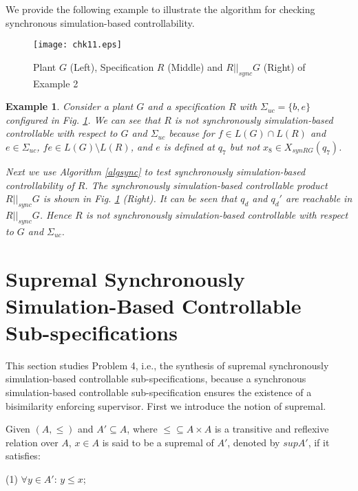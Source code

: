 \documentclass[preprint,authoryear,12pt]{elsarticle}
\newtheorem{Example}{Example}
\begin{document}
We provide the following example to illustrate the algorithm for
checking synchronous simulation-based controllability.

\begin{figure}[!htb]
\begin{center}
\texttt{[image: chk11.eps]}
\caption{ Plant $G$ (Left), Specification $R$ (Middle) and
$R||_{sync} G$ (Right) of Example 2} \label{chk1}
\end{center}
\end{figure}


\begin{Example}\label{checksync}
Consider a plant $G$ and a specification $R$ with
$\Sigma_{uc}=\{b, e\}$ configured in Fig. \ref{chk1}. We can see
that $R$ is not synchronously simulation-based controllable with
respect to $G$ and $\Sigma_{uc}$ because for $f \in L(G)\cap L(R)$
and $e \in \Sigma_{uc}$, $fe \in L(G)\!\setminus L(R)$, and $e$ is
defined at $q_7$ but not $x_8 \in X_{synRG}(q_7)$.

Next we use Algorithm \ref{algsync} to test synchronously
simulation-based controllability of $R$. The synchronously
simulation-based controllable product $R||_{sync}G$ is shown in
Fig. \ref{chk1} (Right). It can be seen that $q_d$ and $q_d'$ are
reachable in $R||_{sync}G$. Hence $R$ is not synchronously
simulation-based controllable with respect to $G$ and
$\Sigma_{uc}$.
\end{Example}










\section{Supremal Synchronously Simulation-Based Controllable Sub-specifications}
This section studies Problem 4, i.e., the synthesis of supremal
synchronously simulation-based controllable sub-specifications,
because a synchronous simulation-based controllable
sub-specification ensures the existence of a bisimilarity
enforcing supervisor. First we introduce the notion of supremal.


Given $(A, \leq)$ and $A' \subseteq A$, where $\leq \subseteq A
\times A$ is a transitive and reflexive relation over $A$, $x \in
A$ is said to be a supremal of $A'$, denoted by $supA'$, if it
satisfies:

(1) $\forall y \in A'$: $y \leq x$;
\end{document}

